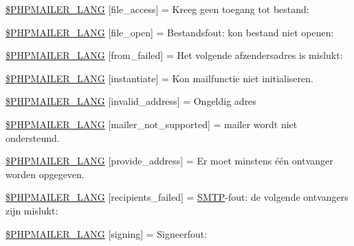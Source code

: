 \begin{DoxyCompactItemize}
\item 
\hyperlink{phpmailer_8lang-nl_8php_a7e83349023b856ef9e5c46e30ae6d51e}{\$\+P\+H\+P\+M\+A\+I\+L\+E\+R\+\_\+\+L\+A\+NG} \mbox{[}\textquotesingle{}file\+\_\+access\textquotesingle{}\mbox{]} = \textquotesingle{}Kreeg geen toegang tot bestand\+: \textquotesingle{}
\item 
\hyperlink{phpmailer_8lang-nl_8php_a28d1a6517bf4c942a0ddd506188ad2e0}{\$\+P\+H\+P\+M\+A\+I\+L\+E\+R\+\_\+\+L\+A\+NG} \mbox{[}\textquotesingle{}file\+\_\+open\textquotesingle{}\mbox{]} = \textquotesingle{}Bestandsfout\+: kon bestand niet openen\+: \textquotesingle{}
\item 
\hyperlink{phpmailer_8lang-nl_8php_adf832ae12155a09be077c6d5e4fd7e22}{\$\+P\+H\+P\+M\+A\+I\+L\+E\+R\+\_\+\+L\+A\+NG} \mbox{[}\textquotesingle{}from\+\_\+failed\textquotesingle{}\mbox{]} = \textquotesingle{}Het volgende afzendersadres is mislukt\+: \textquotesingle{}
\item 
\hyperlink{phpmailer_8lang-nl_8php_ad58dde16780f4770ccf4dd282ea1f5ad}{\$\+P\+H\+P\+M\+A\+I\+L\+E\+R\+\_\+\+L\+A\+NG} \mbox{[}\textquotesingle{}instantiate\textquotesingle{}\mbox{]} = \textquotesingle{}Kon mailfunctie niet initialiseren.\textquotesingle{}
\item 
\hyperlink{phpmailer_8lang-nl_8php_a42d61bcea4c79599ecb44fd062f54d47}{\$\+P\+H\+P\+M\+A\+I\+L\+E\+R\+\_\+\+L\+A\+NG} \mbox{[}\textquotesingle{}invalid\+\_\+address\textquotesingle{}\mbox{]} = \textquotesingle{}Ongeldig adres\textquotesingle{}
\item 
\hyperlink{phpmailer_8lang-nl_8php_aa2ebcb8833ee83a7ad67401c4bb3a6ad}{\$\+P\+H\+P\+M\+A\+I\+L\+E\+R\+\_\+\+L\+A\+NG} \mbox{[}\textquotesingle{}mailer\+\_\+not\+\_\+supported\textquotesingle{}\mbox{]} = \textquotesingle{} mailer wordt niet ondersteund.\textquotesingle{}
\item 
\hyperlink{phpmailer_8lang-nl_8php_a8b97897c2406b7392b056f375feeefbb}{\$\+P\+H\+P\+M\+A\+I\+L\+E\+R\+\_\+\+L\+A\+NG} \mbox{[}\textquotesingle{}provide\+\_\+address\textquotesingle{}\mbox{]} = \textquotesingle{}Er moet minstens één ontvanger worden opgegeven.\textquotesingle{}
\item 
\hyperlink{phpmailer_8lang-nl_8php_a7589d30bb9b368327c2df015f3e6bcba}{\$\+P\+H\+P\+M\+A\+I\+L\+E\+R\+\_\+\+L\+A\+NG} \mbox{[}\textquotesingle{}recipients\+\_\+failed\textquotesingle{}\mbox{]} = \textquotesingle{}\hyperlink{class_s_m_t_p}{S\+M\+TP}-\/fout\+: de volgende ontvangers zijn mislukt\+: \textquotesingle{}
\item 
\hyperlink{phpmailer_8lang-nl_8php_a68e437bdb9b968a5a67320f03d231565}{\$\+P\+H\+P\+M\+A\+I\+L\+E\+R\+\_\+\+L\+A\+NG} \mbox{[}\textquotesingle{}signing\textquotesingle{}\mbox{]} = \textquotesingle{}Signeerfout\+: \textquotesingle{}

\end{DoxyCompactItemize}
